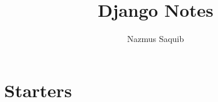 \documentclass[10pt, a4paper]{article}
\begin{document}
\title{Django Notes}
\author{Nazmus Saquib}

\maketitle
\tableofcontents

\section{Starters}
\end{document}
